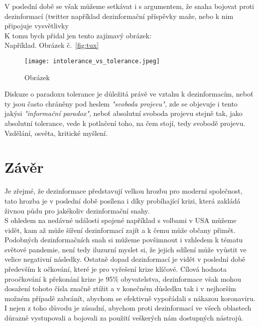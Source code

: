 V poslední době se však můžeme setkávat i s argumentem, že snaha bojovat proti dezinformací (twitter například dezinformační příspěvky maže, nebo k nim připojuje vysvětlivky\\

K tomu bych přidal jen tento zajímavý obrázek:\\

Například. Obrázek č.~\ref{fig:tux}

\begin{figure}[htbp]
  \centering
  \texttt{[image: intolerance\_vs\_tolerance.jpeg]}
  \caption{Obrázek}
  \label{fig:google trends}
\end{figure}

Diskuze o paradoxu tolerance je důležitá právě ve vztahu k dezinformacím, neboť ty jsou často chráněny pod heslem \textit{"svoboda projevu"}, zde se objevuje i tento jakýsi \textit{"informační paradox"}, neboť absolutní svoboda projevu stejně tak, jako absolutní tolerance, vede k potlačení toho, na čem stojí, tedy svobodě projevu.\\

Vzdělání, osvěta, kritické myšlení.

\newpage

\section{Závěr}

Je zřejmé, že dezinformace představují velkou hrozbu pro moderní společnost, tato hrozba je v poslední době posílena i díky probíhající krizi, která zakládá živnou půdu pro jakékoliv dezinformační snahy.\\

S ohledem na nedávné události spojené například s volbami v USA můžeme vidět, kam až může šíření dezinformací zajít a k čemu může občany přimět.\\

Podobných dezinformačních snah si můžeme povšimnout i vzhledem k tématu světové pandemie, není tedy iluzurní myslet si, že jejich sdílení může vyůstit ve velice negativní následky. Ostatně dopad dezinformací je vidět v poslední době především k očkování, které je pro vyřešení krize klíčové. Cílová hodnota proočkování k překonání krize je 95\% obyvatelstva, dezinformace však mohou dosažení tohoto čísla značně ztížit a v konečném důsledku tak i v nejhorším možném případě zabránít, abychom se efektivně vypořádali s nákazou koronaviru. I nejen z toho důvodu je zásadní, abychom proti dezinformací ve všech oblastech důrazně vystupovali a bojovali za použití veškerých nám dostupných nástrojů.

